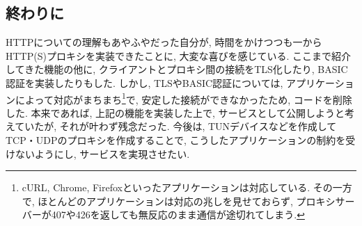 \documentclass[a4paper,uplatex,a4j,dvipdfmx]{jsarticle}
\begin{document}
\begin{multicols}{2}
    \section{終わりに}
    HTTPについての理解もあやふやだった自分が, 時間をかけつつも一からHTTP(S)プロキシを実装できたことに, 大変な喜びを感じている.
    ここまで紹介してきた機能の他に, クライアントとプロキシ間の接続をTLS化したり, BASIC認証を実装したりもした.
    しかし, TLSやBASIC認証については, アプリケーションによって対応がまちまち\footnote{cURL\cite{curlhttps}, Chrome\cite{chromehttps}, Firefox\cite{firefoxhttps}といったアプリケーションは対応している. その一方で, ほとんどのアプリケーションは対応の兆しを見せておらず, プロキシサーバーが407や426を返しても無反応のまま通信が途切れてしまう.}で, 安定した接続ができなかったため, コードを削除した. 本来であれば, 上記の機能を実装した上で, サービスとして公開しようと考えていたが, それが叶わず残念だった.
    今後は, TUNデバイスなどを作成してTCP・UDPのプロキシを作成することで, こうしたアプリケーションの制約を受けないようにし, サービスを実現させたい.

    \end{multicols}


  \printbibliography[title=参考文献]
\end{document}
